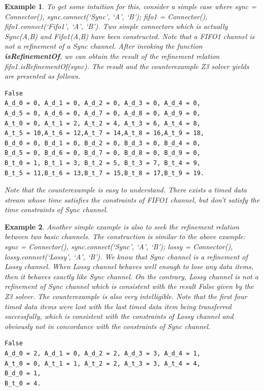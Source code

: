 \documentclass[3p,times]{elsarticle}
\newtheorem{example}{Example}[section]
\begin{document}
\begin{example}
To get some intuition for this, consider a simple case where \emph{sync = Connector(), sync.connect(`Sync', `A', `B'); fifo1 = Connector(),
fifo1.connect(`Fifo1', `A', `B')}. Two simple connectors which is actually \emph{Sync(A,B)} and \emph{Fifo1(A,B)} have been constructed. Note that a \emph{FIFO1} channel is not a refinement of a \emph{Sync} channel. After invoking the function \textbf{\emph{isRefinementOf}}, we can obtain the result of the refinement relation \emph{fifo1.isRefinementOf(sync)}. The result and the counterexample Z3 solver yields are presented as follows.
\begin{lstlisting}[frame=single]
False
A_d_0 = 0, A_d_1 = 0, A_d_2 = 0, A_d_3 = 0, A_d_4 = 0,
A_d_5 = 0, A_d_6 = 0, A_d_7 = 0, A_d_8 = 0, A_d_9 = 0,
A_t_0 = 0, A_t_1 = 2, A_t_2 = 4, A_t_3 = 6, A_t_4 = 8,
A_t_5 = 10,A_t_6 = 12,A_t_7 = 14,A_t_8 = 16,A_t_9 = 18,
B_d_0 = 0, B_d_1 = 0, B_d_2 = 0, B_d_3 = 0, B_d_4 = 0,
B_d_5 = 0, B_d_6 = 0, B_d_7 = 0, B_d_8 = 0, B_d_9 = 0,
B_t_0 = 1, B_t_1 = 3, B_t_2 = 5, B_t_3 = 7, B_t_4 = 9,
B_t_5 = 11,B_t_6 = 13,B_t_7 = 15,B_t_8 = 17,B_t_9 = 19.
\end{lstlisting}
Note that the counterexample is easy to understand. There exists a timed data stream whose time satisfies the constraints of \emph{FIFO1} channel, but don't satisfy the time constraints of \emph{Sync} channel.
\end{example}
\begin{example}
Another simple example is also to seek the refinement relation between two basic channels. The construction is similar to the above example: \emph{sync = Connector(), sync.connect(`Sync', `A', `B'); lossy = Connector(), lossy.connect(`Lossy', `A', `B')}. We know that \emph{Sync} channel is a refinement of \emph{Lossy} channel. When \emph{Lossy} channel behaves well enough to lose any data items, then it behaves exactly like \emph{Sync} channel. On the contrary, \emph{Lossy} channel is not a refinement of \emph{Sync} channel which is consistent with the result \emph{False} given by the Z3 solver. The counterexample is also very intelligible. Note that the first four timed data items were lost with the last timed data item being transferred successfully, which is consistent with the constraints of \emph{Lossy} channel and obviously not in concordance with the constraints of \emph{Sync} channel.
\begin{lstlisting}[frame=single]
False
A_d_0 = 2, A_d_1 = 0, A_d_2 = 2, A_d_3 = 3, A_d_4 = 1,
A_t_0 = 0, A_t_1 = 1, A_t_2 = 2, A_t_3 = 3, A_t_4 = 4,
B_d_0 = 1,
B_t_0 = 4.
\end{lstlisting}
\end{example}
\end{document}
